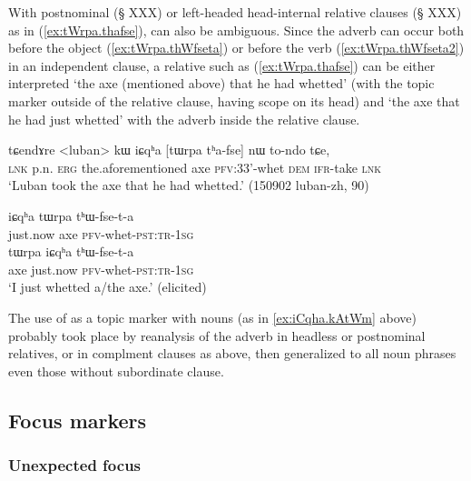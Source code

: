 With postnominal (§ XXX) or left-headed head-internal relative clauses (§ XXX) as in (\ref{ex:tWrpa.thafse}),  can also be ambiguous. Since the adverb  can occur both before the object (\ref{ex:tWrpa.thWfseta}) or before the verb (\ref{ex:tWrpa.thWfseta2}) in an independent clause, a relative such as (\ref{ex:tWrpa.thafse}) can be either interpreted `the axe (mentioned above) that he had whetted' (with the topic marker  outside of the relative clause, having scope on its head) and `the axe that he had just whetted' with the adverb  inside the relative clause.

 \begin{exe}
\ex \label{ex:tWrpa.thafse}
 \gll  tɕendɤre <luban> kɯ iɕqʰa [tɯrpa tʰa-fse] nɯ to-ndo tɕe, \\
 \textsc{lnk} p.n. \textsc{erg} the.aforementioned axe \textsc{pfv}:3\fl{}3'-whet \textsc{dem} \textsc{ifr}-take \textsc{lnk} \\
 \glt `Luban took the axe that he had whetted.' (150902 luban-zh, 90)
 \end{exe}

  \begin{exe}
  \ex 
  \begin{xlist}
\ex \label{ex:tWrpa.thWfseta}
 \gll   iɕqʰa tɯrpa tʰɯ-fse-t-a \\
just.now axe \textsc{pfv}-whet-\textsc{pst}:\textsc{tr}-\textsc{1sg} \\
\ex \label{ex:tWrpa.thWfseta2}
 \gll   tɯrpa  iɕqʰa tʰɯ-fse-t-a \\
 axe just.now \textsc{pfv}-whet-\textsc{pst}:\textsc{tr}-\textsc{1sg} \\
 \glt `I just whetted a/the axe.' (elicited)
 \end{xlist}
 \end{exe}

The use of  as a topic marker with nouns (as in \ref{ex:iCqha.kAtWm} above) probably took place by reanalysis of the adverb in headless or postnominal relatives, or in complment clauses as above, then generalized to all noun phrases even those without subordinate clause.

 \subsection{Focus markers} \label{sec:focus}
   \subsubsection{Unexpected focus} \label{sec:unexpected}
